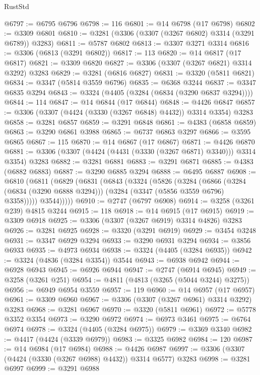\begin{lexlean}{RustStd}
\begin{coremodule}
@6797 := @6795 @6796
@6798 := 116
@6801 := @14 @6798 (@17 @6798)
@6802 := @3309 @6801
@6810 := @3281 (@3306 (@3307 (@3267 @6802) @3314 (@3291 @6789)) @3283)
@6811 := @5787 @6802
@6813 := @3307 @3271 @3314
@6816 := @3306 (@6813 (@3291 @6802))
@6817 := 113
@6820 := @14 @6817 (@17 @6817)
@6821 := @3309 @6820
@6827 := @3306 (@3307 (@3267 @6821) @3314 @3292) @3283
@6829 := @3281 (@6816 @6827)
@6831 := @3320 (@5811 @6821)
@6834 := @3347 (@5814 @3559 @6796)
@6835 := @6368 @3244
@6837 := @3347 @6835 @3294
@6843 := @3324 (@4405 (@3284 (@6834 (@3290 @6837 @3294))))
@6844 := 114
@6847 := @14 @6844 (@17 @6844)
@6848 := @4426 @6847
@6857 := @3306 (@3307 (@4424 (@3330 (@3267 @6848) @4432)) @3314 @3354) @3283
@6858 := @3281 @6857
@6859 := @3291 @6848
@6861 := @4383 (@6858 @6859)
@6863 := @3290 @6861 @3988
@6865 := @6737 @6863 @3297
@6866 := @3595 @6865
@6867 := 115
@6870 := @14 @6867 (@17 @6867)
@6871 := @4426 @6870
@6881 := @3306 (@3307 (@4424 (@4431 (@3330 (@3267 @6871) @3340))) @3314 @3354) @3283
@6882 := @3281 @6881
@6883 := @3291 @6871
@6885 := @4383 (@6882 @6883)
@6887 := @3290 @6885 @3294
@6888 := @6495 @6887
@6908 := @6810
    (@6811
      (@6829
        (@6831
          (@6843
            (@3324
              (@5826
                (@3284
                  (@6866
                    (@3284 (@6834 (@3290 @6888 @3294)))
                    (@3284 (@3347 (@5856 @3559 @6796) @3358)))))
              @3544)))))
@6910 := @2747 (@6797 @6908)
@6914 := @3258 (@3261 @239) @4815 @3244
@6915 := 118
@6918 := @14 @6915 (@17 @6915)
@6919 := @3309 @6918
@6925 := @3306 (@3307 (@3267 @6919) @3314 @4826) @3283
@6926 := @3281 @6925
@6928 := @3320 (@3291 @6919)
@6929 := @3454 @3248
@6931 := @3347 @6929 @3294
@6933 := @3290 @6931 @3294
@6934 := @3856 @6933
@6935 := @4973 @6934
@6938 := @3324 (@4405 (@3284 @6935))
@6942 := @3324 (@4836 (@3284 @3354)) @3544
@6943 := @6938 @6942
@6944 := @6928 @6943
@6945 := @6926 @6944
@6947 := @2747 (@6914 @6945)
@6949 := @3258 (@3261 @251)
@6954 := @4811 (@4813 (@3265 (@5044 @3244) @3275))
@6956 := @6949 @6954 @3559
@6957 := 119
@6960 := @14 @6957 (@17 @6957)
@6961 := @3309 @6960
@6967 := @3306 (@3307 (@3267 @6961) @3314 @3292) @3283
@6968 := @3281 @6967
@6970 := @3320 (@5811 @6961)
@6972 := @5778 @3352 @3354
@6973 := @3290 @6972
@6974 := @6973 @3461
@6975 := @6764 @6974
@6978 := @3324 (@4405 (@3284 @6975))
@6979 := @3369 @3340
@6982 := @4417 (@4424 (@3339 @6979))
@6983 := @3325 @6982
@6984 := 120
@6987 := @14 @6984 (@17 @6984)
@6988 := @4426 @6987
@6997 := @3306 (@3307 (@4424 (@3330 (@3267 @6988) @4432)) @3314 @6577) @3283
@6998 := @3281 @6997
@6999 := @3291 @6988

\end{coremodule}
\end{lexlean}

